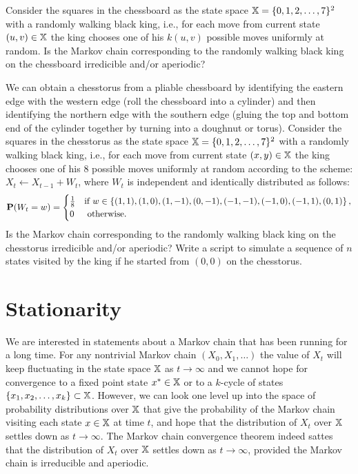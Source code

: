 {\begin{exercise}\label{EXR:KingRWChessBoard}
Consider the squares in the chessboard as the state space $\mathbb{X} = \{ 0,1,2,\ldots,7\}^2$ with a randomly walking black king, i.e., for each move from current state $(u,v) \in \mathbb{X}$ the king chooses one of his $k(u,v)$ possible moves uniformly at random.  
Is the Markov chain corresponding to the randomly walking black king on the chessboard irredicible and/or aperiodic?  
\end{exercise}

\begin{exercise}\label{EXR:KingRWChessTorus}
We can obtain a chesstorus from a pliable chessboard by identifying the eastern edge with the western edge (roll the chessboard into a cylinder) and then identifying the northern edge with the southern edge (gluing the top and bottom end of the cylinder together by turning into a doughnut or torus).  Consider the squares in the chesstorus as the state space $\mathbb{X} = \{ 0,1,2,\ldots,7\}^2$ with a randomly walking black king, i.e., for each move from current state $(x,y) \in \mathbb{X}$ the king chooses one of his $8$ possible moves uniformly at random according to the scheme: $X_t \gets X_{t-1}+ W_t$, where $W_t$ is independent and identically distributed as follows:
\[ 
\mathbf{P}(W_t = w) = 
\begin{cases}
\frac{1}{8} & \text{if } w \in \left\{ (1,1), (1,0), (1,-1), (0,-1), (-1,-1), (-1,0), (-1,1), (0,1) \right\} , \\
0 & \text{ otherwise}.
\end{cases}
\]
Is the Markov chain corresponding to the randomly walking black king on the chesstorus irredicible and/or aperiodic?  Write a \Matlab script to simulate a sequence of $n$ states visited by the king if he started from $(0,0)$ on the chesstorus.
\end{exercise}

\section{Stationarity}\label{S:Stationarity}

We are interested in statements about a Markov chain that has been running for a long time.  
For any nontrivial Markov chain $(X_0,X_1,\ldots)$ the value of $X_t$ will keep fluctuating in the state space $\mathbb{X}$ as $t \to \infty$ and we cannot hope for convergence to a fixed point state $x^* \in \mathbb{X}$ or to a $k$-cycle of states $\{x_1,x_2,\ldots,x_k\} \subset \mathbb{X}$.  However, we can look one level up into the space of probability distributions over $\mathbb{X}$ that give the probability of the Markov chain visiting each state $x \in \mathbb{X}$ at time $t$, and hope that the distribution of $X_t$ over $\mathbb{X}$ settles down as $t \to \infty$.  The Markov chain convergence theorem indeed sattes that the distribution of $X_t$ over $\mathbb{X}$ settles down as $t \to \infty$, provided the Markov chain is irreducible and aperiodic.

}

